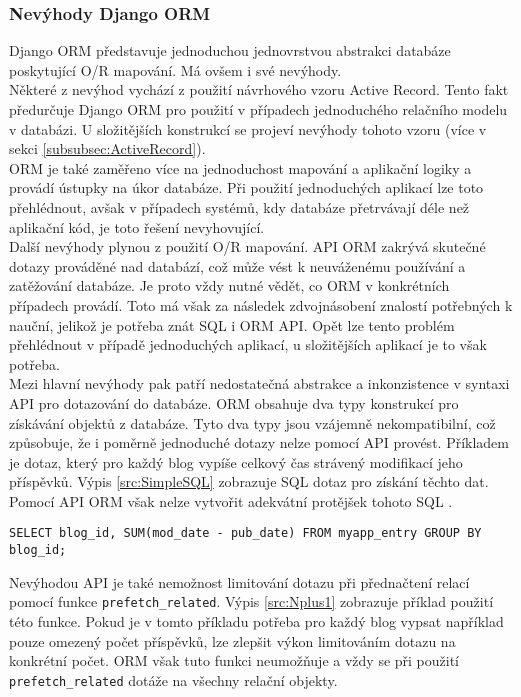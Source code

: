 \documentclass[ing,male,java,dept456]{diploma}						%
\begin{document}
\subsubsection{Nevýhody Django ORM}

Django ORM představuje jednoduchou jednovrstvou abstrakci databáze poskytující O/R mapování. Má ovšem i své nevýhody. \\
Některé z nevýhod vychází z použití návrhového vzoru Active Record. Tento fakt předurčuje Django ORM pro použití v případech jednoduchého relačního modelu v databázi. U složitějších konstrukcí se projeví nevýhody tohoto vzoru (více v sekci \ref{subsubsec:ActiveRecord}). \\
ORM je také zaměřeno více na jednoduchost mapování a aplikační logiky a provádí ústupky na úkor databáze. Při použití jednoduchých aplikací lze toto přehlédnout, avšak v případech systémů, kdy databáze přetrvávají déle než aplikační kód, je toto řešení nevyhovující. \\
Další nevýhody plynou z použití O/R mapování. API ORM zakrývá skutečné dotazy prováděné nad databází, což může vést k neuváženému používání a zatěžování databáze. Je proto vždy nutné vědět, co ORM v konkrétních případech provádí. Toto má však za následek zdvojnásobení znalostí potřebných k nauční, jelikož je potřeba znát SQL i ORM API. Opět lze tento problém přehlédnout v případě jednoduchých aplikací, u složitějších aplikací je to však potřeba. \\
Mezi hlavní nevýhody pak patří nedostatečná abstrakce a inkonzistence v syntaxi API pro dotazování do databáze. ORM obsahuje dva typy konstrukcí pro získávání objektů z databáze. Tyto dva typy jsou vzájemně nekompatibilní, což způsobuje, že i poměrně jednoduché dotazy nelze pomocí API provést. Příkladem je dotaz, který pro každý blog vypíše celkový čas strávený modifikací jeho příspěvků. Výpis \ref{src:SimpleSQL} zobrazuje SQL dotaz pro získání těchto dat. Pomocí API ORM však nelze vytvořit adekvátní protějšek tohoto SQL \cite{dj-dis}.
\begin{lstlisting}[style=customsql, label=src:SimpleSQL, caption={Příklad dotazu, který nelze provést pomocí Django ORM API}]
SELECT blog_id, SUM(mod_date - pub_date) FROM myapp_entry GROUP BY blog_id;
\end{lstlisting}

Nevýhodou API je také nemožnost limitování dotazu při přednačtení relací pomocí funkce \lstinline[style=custompython]|prefetch_related|. Výpis \ref{src:Nplus1} zobrazuje příklad použití této funkce. Pokud je v tomto příkladu potřeba pro každý blog vypsat například pouze omezený počet příspěvků, lze zlepšit výkon limitováním dotazu na konkrétní počet. ORM však tuto funkci neumožňuje a vždy se při použití \lstinline[style=custompython]|prefetch_related| dotáže na všechny relační objekty. \\
\end{document}
